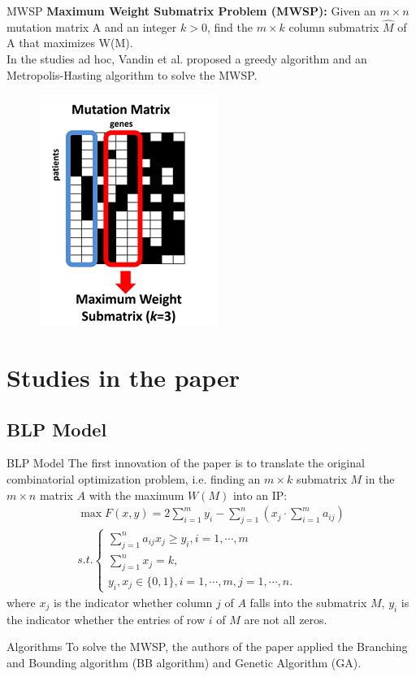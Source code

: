 \documentclass[xcolor=dvipsnames]{beamer}
\begin{document}
\begin{frame}{MWSP}
\textbf{Maximum Weight Submatrix Problem (MWSP):} Given an $m \times n$ mutation matrix A and an integer $k > 0$, find the $m \times k$ column submatrix $\hat{M}$ of A that maximizes W(M).\\
In the studies ad hoc, Vandin et al. proposed a greedy algorithm and an Metropolis-Hasting algorithm to solve the MWSP.\\
\begin{figure}
\centering
\includegraphics[width=0.3\linewidth]{mat.png}
\end{figure}
\end{frame}
\section{Studies in the paper}
\subsection{BLP Model}
\begin{frame}{BLP Model}
The first innovation of the paper is to translate the original combinatorial optimization problem, i.e. finding an $m\times k$ submatrix $M$ in the $m\times n$ matrix $A$ with the maximum $W(M)$ into an IP:\\
\begin{eqnarray}
\max F(x,y)=2\sum_{i=1}^my_i-\sum_{j=1}^n(x_j\cdot\sum_{i=1}^ma_{ij})\nonumber\\
s.t.
\left\{
\begin{array}{c}
\sum_{j=1}^na_{ij}x_j\geqslant y_i, i=1,\cdots,m\\
\sum_{j=1}^nx_j=k,\\
y_i,x_j\in\{0,1\},i=1,\cdots,m,j=1,\cdots,n.
\end{array}
\right.\nonumber
\end{eqnarray}
where $x_j$ is the indicator whether column $j$ of $A$ falls into the submatrix $M$, $y_i$ is the indicator whether the entries of row $i$ of $M$ are not all zeros.\\
\end{frame}
\begin{frame}{Algorithms}
To solve the MWSP, the authors of the paper applied the Branching and Bounding algorithm (BB algorithm) and Genetic Algorithm (GA).\\
\end{frame}
\end{document}
